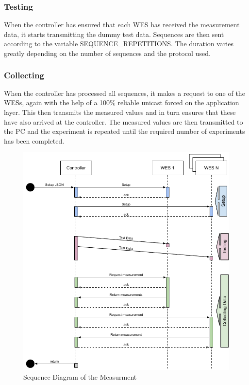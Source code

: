 \subsubsection*{Testing}
When the controller has ensured that each WES has received the measurement data, it starts transmitting the dummy test data.
Sequences are then sent according to the variable SEQUENCE\_REPETITIONS.
The duration varies greatly depending on the number of sequences and the protocol used.
\subsubsection*{Collecting}
When the controller has processed all sequences, it makes a request to one of the WESs, 
again with the help of a 100\% reliable unicast forced on the application layer.
This then transmits the measured values and in turn ensures that these have also arrived at the controller.
The measured values are then transmitted to the PC and the experiment is repeated until the required number of experiments has been completed.

\begin{figure}[h]
	\centering
	\includegraphics[scale=0.9]{figures/sequence_diagram_drive.pdf}
	\caption{Sequence Diagram of the Measurment}
	\label{fig:sequenceDiagram}
\end{figure}

